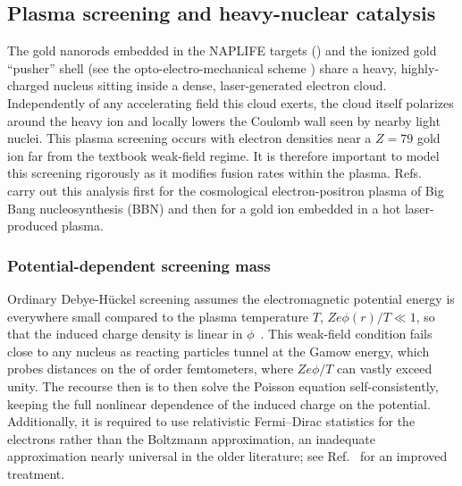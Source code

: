\subsection{Plasma screening and heavy-nuclear catalysis}\label{ssec:PlasmaScreening}
The gold nanorods embedded in the NAPLIFE targets () and the ionized gold ``pusher'' shell (see the opto-electro-mechanical scheme ) share a heavy, highly-charged nucleus sitting inside a dense, laser-generated electron cloud. Independently of any accelerating field this cloud exerts, the cloud itself polarizes around the heavy ion and locally lowers the Coulomb wall seen by nearby light nuclei. This plasma screening occurs with electron densities near a $Z=79$ gold ion far from the textbook weak-field regime. It is therefore important to model this screening rigorously as it modifies fusion rates within the plasma. Refs.~\cite{Grayson:2024uwg,Grayson:2025kva} carry out this analysis first for the cosmological electron-positron plasma of Big Bang nucleosynthesis (BBN) and then for a gold ion embedded in a hot laser-produced plasma.

\subsubsection{Potential-dependent screening mass}\label{sssec:ScreeningMass}

Ordinary Debye-H\"uckel screening assumes the electromagnetic potential energy is everywhere small compared to the plasma temperature $T$, $Ze\phi(r)/T\ll1$, so that the induced charge density is linear in $\phi$~\cite{Barker:2002mfp}. This weak-field condition fails close to any nucleus as reacting particles tunnel at the Gamow energy, which probes distances on the of order femtometers, where $Ze\phi/T$ can vastly exceed unity. The recourse then is to then solve the Poisson equation self-consistently, keeping the full nonlinear dependence of the induced charge on the potential. Additionally, it is required to use relativistic Fermi--Dirac statistics for the electrons rather than the Boltzmann approximation, an inadequate approximation nearly universal in the older literature; see Ref.~\cite{Birrell:2024bdb} for an improved treatment.

